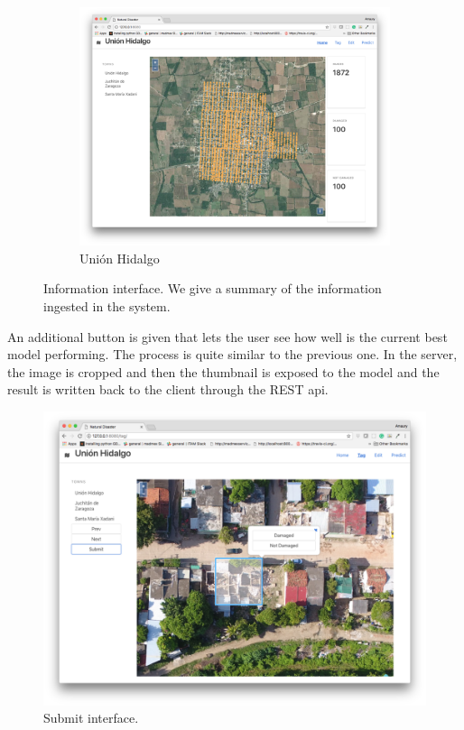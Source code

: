 \begin{figure}[ht]
\begin{subfigure}{.49\textwidth}
        \includegraphics[width=\textwidth]{images/small-app-union.png}
        \caption{Uni\'on Hidalgo}
    \end{subfigure}
  
  \caption{Information interface. We give a summary of the information ingested in the system.}
  \label{fig:visualize}
\end{figure}



An additional button is given that lets the user see how well is the current best model performing. The process is quite similar to the previous one. In the server, the image is cropped and then the thumbnail is exposed to the model and the result is written back to the client through the REST api.

\begin{figure}[h]
  \centering
  \includegraphics[width=1\textwidth]{images/small-app-tag.png}
  \caption{Submit interface.}
  \label{fig:submit}
\end{figure}

